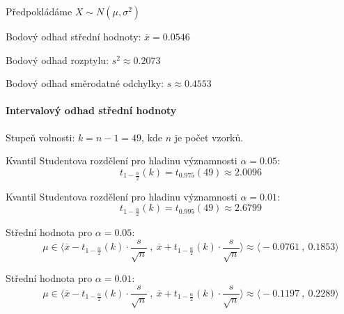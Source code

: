 \begin{compactitem}
    \item Předpokládáme ${\displaystyle X \sim N(\mu, \sigma^2)}$

    \item Bodový odhad střední hodnoty: ${\displaystyle \overline{x} = 0.0546}$

    \item Bodový odhad rozptylu: ${\displaystyle s^2 \approx 0.2073}$

    \item Bodový odhad směrodatné odchylky: ${\displaystyle s \approx 0.4553}$
\end{compactitem}

\paragraph*{Intervalový odhad střední hodnoty}

\begin{compactitem}
    \item Stupeň volnosti: ${\displaystyle k = n - 1 = 49}$, kde $n$ je počet vzorků.

    \item Kvantil Studentova rozdělení pro hladinu významnosti ${\displaystyle \alpha = 0.05}$:
    $${\displaystyle \qquad t_{1 - \frac{\alpha}{2}}(k) = t_{0.975}(49) \approx 2.0096}$$

    \item Kvantil Studentova rozdělení pro hladinu významnosti ${\displaystyle \alpha = 0.01}$:
    $${\displaystyle \qquad t_{1 - \frac{\alpha}{2}}(k) = t_{0.995}(49) \approx 2.6799}$$

    \item Střední hodnota pro ${\displaystyle \alpha = 0.05 :}$
    $${\displaystyle \qquad \mu \in \bigg\langle \overline{x} - t_{1 - \frac{\alpha}{2}}(k) \cdot \frac{s}{\sqrt{n}} ~,~ \overline{x} + t_{1 - \frac{\alpha}{2}}(k) \cdot \frac{s}{\sqrt{n}} \bigg\rangle \approx \bigg\langle -0.0761 ~,~ 0.1853 \bigg\rangle}$$

    \item Střední hodnota pro ${\displaystyle \alpha = 0.01 :}$
    $${\displaystyle \qquad \mu \in \bigg\langle \overline{x} - t_{1 - \frac{\alpha}{2}}(k) \cdot \frac{s}{\sqrt{n}} ~,~ \overline{x} + t_{1 - \frac{\alpha}{2}}(k) \cdot \frac{s}{\sqrt{n}} \bigg\rangle \approx \bigg\langle -0.1197 ~,~ 0.2289 \bigg\rangle}$$
\end{compactitem}

